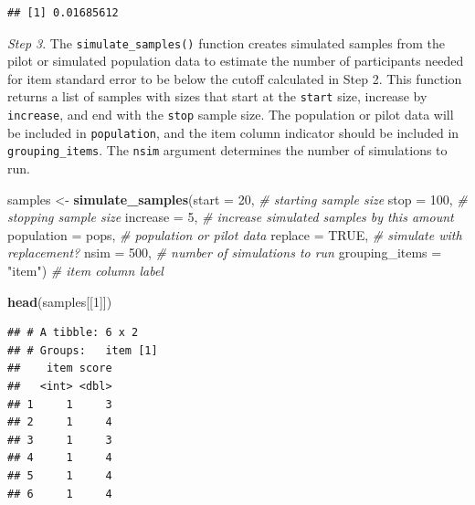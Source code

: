 \documentclass[
  man]{apa7}
\newenvironment{Shaded}{\begin{snugshade}}{\end{snugshade}}
\newcommand{\AttributeTok}[1]{\textcolor[rgb]{0.13,0.29,0.53}{#1}}
\newcommand{\CommentTok}[1]{\textcolor[rgb]{0.56,0.35,0.01}{\textit{#1}}}
\newcommand{\ConstantTok}[1]{\textcolor[rgb]{0.56,0.35,0.01}{#1}}
\newcommand{\DecValTok}[1]{\textcolor[rgb]{0.00,0.00,0.81}{#1}}
\newcommand{\FunctionTok}[1]{\textcolor[rgb]{0.13,0.29,0.53}{\textbf{#1}}}
\newcommand{\NormalTok}[1]{#1}
\newcommand{\OtherTok}[1]{\textcolor[rgb]{0.56,0.35,0.01}{#1}}
\newcommand{\SpecialCharTok}[1]{\textcolor[rgb]{0.81,0.36,0.00}{\textbf{#1}}}
\newcommand{\StringTok}[1]{\textcolor[rgb]{0.31,0.60,0.02}{#1}}
\begin{document}
\begin{Shaded}
\end{Shaded}

\begin{verbatim}
## [1] 0.01685612
\end{verbatim}

\emph{Step 3}. The \texttt{simulate\_samples()} function creates simulated samples from the pilot or simulated population data to estimate the number of participants needed for item standard error to be below the cutoff calculated in Step 2. This function returns a list of samples with sizes that start at the \texttt{start} size, increase by \texttt{increase}, and end with the \texttt{stop} sample size. The population or pilot data will be included in \texttt{population}, and the item column indicator should be included in \texttt{grouping\_items}. The \texttt{nsim} argument determines the number of simulations to run.

\begin{Shaded}
\begin{Highlighting}[]
\NormalTok{samples }\OtherTok{\textless{}{-}} \FunctionTok{simulate\_samples}\NormalTok{(}\AttributeTok{start =} \DecValTok{20}\NormalTok{, }\CommentTok{\# starting sample size}
  \AttributeTok{stop =} \DecValTok{100}\NormalTok{, }\CommentTok{\# stopping sample size}
  \AttributeTok{increase =} \DecValTok{5}\NormalTok{, }\CommentTok{\# increase simulated samples by this amount}
  \AttributeTok{population =}\NormalTok{ pops, }\CommentTok{\# population or pilot data}
  \AttributeTok{replace =} \ConstantTok{TRUE}\NormalTok{, }\CommentTok{\# simulate with replacement? }
  \AttributeTok{nsim =} \DecValTok{500}\NormalTok{, }\CommentTok{\# number of simulations to run}
  \AttributeTok{grouping\_items =} \StringTok{"item"}\NormalTok{) }\CommentTok{\# item column label  }

\FunctionTok{head}\NormalTok{(samples[[}\DecValTok{1}\NormalTok{]])}
\end{Highlighting}
\end{Shaded}

\begin{verbatim}
## # A tibble: 6 x 2
## # Groups:   item [1]
##    item score
##   <int> <dbl>
## 1     1     3
## 2     1     4
## 3     1     3
## 4     1     4
## 5     1     4
## 6     1     4
\end{verbatim}
\end{document}
